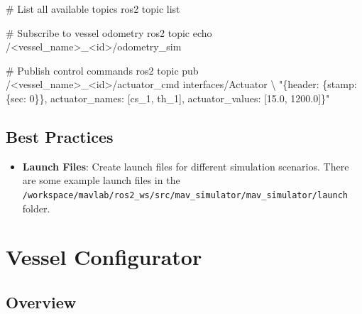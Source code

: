 \documentclass[
  letterpaper,
  DIV=11,
  numbers=noendperiod]{scrreprt}
\newenvironment{Shaded}{\begin{snugshade}}{\end{snugshade}}
\newcommand{\CommentTok}[1]{\textcolor[rgb]{0.37,0.37,0.37}{#1}}
\newcommand{\DataTypeTok}[1]{\textcolor[rgb]{0.68,0.00,0.00}{#1}}
\newcommand{\ExtensionTok}[1]{\textcolor[rgb]{0.00,0.23,0.31}{#1}}
\newcommand{\NormalTok}[1]{\textcolor[rgb]{0.00,0.23,0.31}{#1}}
\newcommand{\OperatorTok}[1]{\textcolor[rgb]{0.37,0.37,0.37}{#1}}
\newcommand{\StringTok}[1]{\textcolor[rgb]{0.13,0.47,0.30}{#1}}
\providecommand{\tightlist}{%
  \setlength{\itemsep}{0pt}\setlength{\parskip}{0pt}}\usepackage{longtable,booktabs,array}
\begin{document}
\begin{Shaded}
\begin{Highlighting}[]
\CommentTok{\# List all available topics}
\ExtensionTok{ros2}\NormalTok{ topic list}

\CommentTok{\# Subscribe to vessel odometry}
\ExtensionTok{ros2}\NormalTok{ topic echo /}\OperatorTok{\textless{}}\NormalTok{vessel\_name}\OperatorTok{\textgreater{}}\NormalTok{\_}\OperatorTok{\textless{}}\NormalTok{id}\OperatorTok{\textgreater{}}\NormalTok{/odometry\_sim}

\CommentTok{\# Publish control commands}
\ExtensionTok{ros2}\NormalTok{ topic pub /}\OperatorTok{\textless{}}\NormalTok{vessel\_name}\OperatorTok{\textgreater{}}\NormalTok{\_}\OperatorTok{\textless{}}\NormalTok{id}\OperatorTok{\textgreater{}}\NormalTok{/actuator\_cmd interfaces/Actuator }\DataTypeTok{\textbackslash{}}
\StringTok{"\{header: \{stamp: \{sec: 0\}\}, actuator\_names: [\textquotesingle{}cs\_1\textquotesingle{}, \textquotesingle{}th\_1\textquotesingle{}], actuator\_values: [15.0, 1200.0]\}"}
\end{Highlighting}
\end{Shaded}

\section*{Best Practices}\label{best-practices-1}


\begin{itemize}
\tightlist
\item
  \textbf{Launch Files}: Create launch files for different simulation
  scenarios. There are some example launch files in the
  \texttt{/workspace/mavlab/ros2\_ws/src/mav\_simulator/mav\_simulator/launch}
  folder.
\end{itemize}


\chapter*{Vessel Configurator}\label{vessel-configurator}


\section*{Overview}\label{overview-6}
\end{document}
